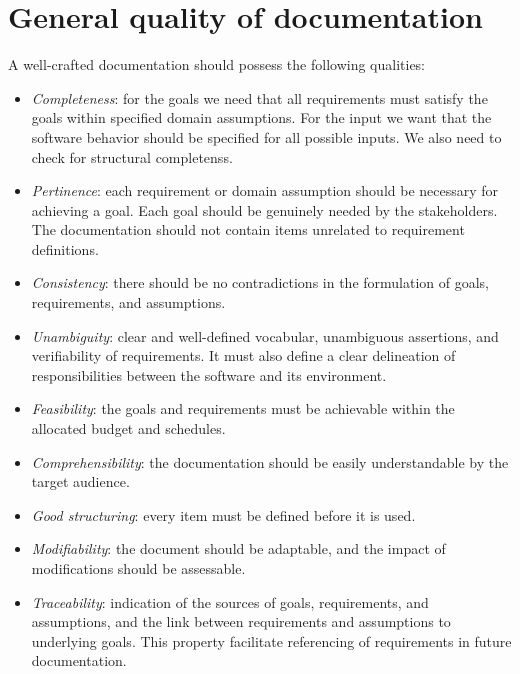 \section{General quality of documentation}

A well-crafted documentation should possess the following qualities:
\begin{itemize}
    \item \textit{Completeness}: for the goals we need that all requirements must satisfy the goals within specified domain assumptions.
        For the input we want that the software behavior should be specified for all possible inputs.
        We also need to check for structural completenss. 
    \item \textit{Pertinence}: each requirement or domain assumption should be necessary for achieving a goal.
        Each goal should be genuinely needed by the stakeholders.
        The documentation should not contain items unrelated to requirement definitions.
    \item \textit{Consistency}: there should be no contradictions in the formulation of goals, requirements, and assumptions.
    \item \textit{Unambiguity}: clear and well-defined vocabular, unambiguous assertions, and verifiability of requirements.
        It must also define a clear delineation of responsibilities between the software and its environment.
    \item \textit{Feasibility}: the goals and requirements must be achievable within the allocated budget and schedules.
    \item \textit{Comprehensibility}: the documentation should be easily understandable by the target audience.
    \item \textit{Good structuring}: every item must be defined before it is used.
    \item \textit{Modifiability}: the document should be adaptable, and the impact of modifications should be assessable.
    \item \textit{Traceability}: indication of the sources of goals, requirements, and assumptions, and the link between requirements and assumptions to underlying goals.
        This property facilitate referencing of requirements in future documentation.
\end{itemize}   